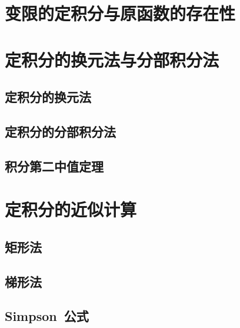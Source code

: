 \section{变限的定积分与原函数的存在性}
\begin{exercise}

\end{exercise}
\section{定积分的换元法与分部积分法}
\subsection{定积分的换元法}
\subsection{定积分的分部积分法}
\subsection{积分第二中值定理}
\begin{exercise}

\end{exercise}
\section{定积分的近似计算}
\subsection{矩形法}
\subsection{梯形法}
\subsection{Simpson~公式}
\begin{exercise}

\end{exercise}
\begin{exercise*}

\end{exercise*}




\endinput
